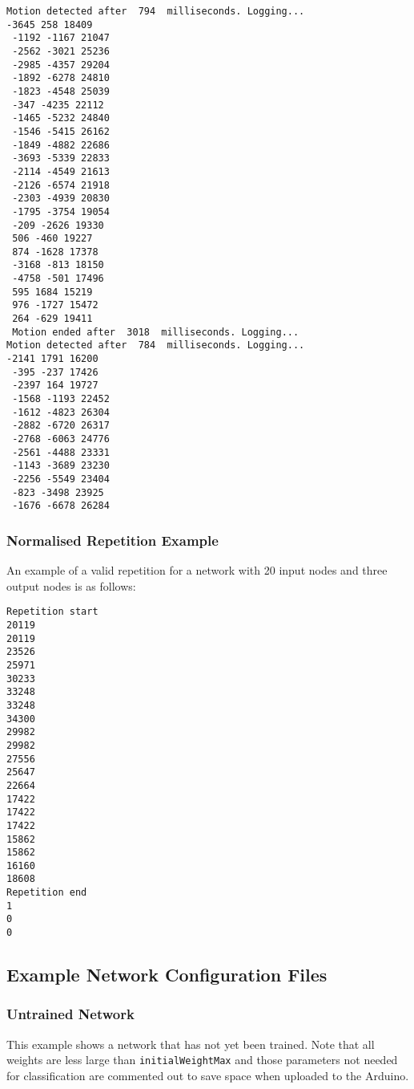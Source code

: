 \documentclass[a4paper]{article}
\begin{document}
\begin{lstlisting}
Motion detected after  794  milliseconds. Logging...
-3645 258 18409
 -1192 -1167 21047
 -2562 -3021 25236
 -2985 -4357 29204
 -1892 -6278 24810
 -1823 -4548 25039
 -347 -4235 22112
 -1465 -5232 24840
 -1546 -5415 26162
 -1849 -4882 22686
 -3693 -5339 22833
 -2114 -4549 21613
 -2126 -6574 21918
 -2303 -4939 20830
 -1795 -3754 19054
 -209 -2626 19330
 506 -460 19227
 874 -1628 17378
 -3168 -813 18150
 -4758 -501 17496
 595 1684 15219
 976 -1727 15472
 264 -629 19411
 Motion ended after  3018  milliseconds. Logging...
Motion detected after  784  milliseconds. Logging...
-2141 1791 16200
 -395 -237 17426
 -2397 164 19727
 -1568 -1193 22452
 -1612 -4823 26304
 -2882 -6720 26317
 -2768 -6063 24776
 -2561 -4488 23331
 -1143 -3689 23230
 -2256 -5549 23404
 -823 -3498 23925
 -1676 -6678 26284
\end{lstlisting}

\subsubsection{Normalised Repetition Example}%
\label{subsubsec:a2_lf_normalised}

An example of a valid repetition for a network with 20 input nodes and three output nodes is as follows:

\begin{lstlisting}
Repetition start
20119
20119
23526
25971
30233
33248
33248
34300
29982
29982
27556
25647
22664
17422
17422
17422
15862
15862
16160
18608
Repetition end
1
0
0
\end{lstlisting}

\subsection{Example Network Configuration Files}%
\label{subsec:a2_configfiles}

\subsubsection{Untrained Network}

This example shows a network that has not yet been trained. Note that all weights are less large than \lstinline{initialWeightMax} and those parameters not needed for classification are commented out to save space when uploaded to the Arduino.
\end{document}
